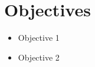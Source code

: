 \section{Objectives}
\label{sec:objectives}


\begin{itemize}
  \item Objective 1
  \item Objective 2
\end{itemize}
